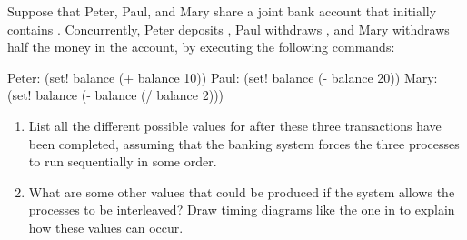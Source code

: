 \begin{exercise}
	\label{Exercise 3.38}
	Suppose that Peter, Paul, and Mary share a joint bank account that initially contains .
	Concurrently, Peter deposits , Paul withdraws , and Mary withdraws half the money in the account, by executing the following commands:
	\begin{scheme}
	  Peter: (set! balance (+ balance 10))
	  Paul:  (set! balance (- balance 20))
	  Mary:  (set! balance (- balance (/ balance 2)))
	\end{scheme}
	\begin{enumerate}[label = \alph*., leftmargin = *]

		\item
			List all the different possible values for  after these three transactions have been completed, assuming that the banking system forces the three processes to run sequentially in some order.

		\item
			What are some other values that could be produced if the system allows the processes to be interleaved?
			Draw timing diagrams like the one in  to explain how these values can occur.

	\end{enumerate}
\end{exercise}
